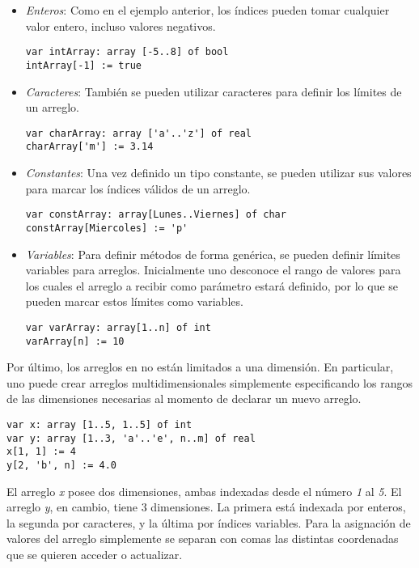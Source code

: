 \documentclass{article}
\begin{document}
\begin{itemize}

\item
\textit{Enteros}: Como en el ejemplo anterior, los índices pueden tomar cualquier valor entero, incluso valores negativos.
\begin{lstlisting}
var intArray: array [-5..8] of bool
intArray[-1] := true
\end{lstlisting}

\item
\textit{Caracteres}: También se pueden utilizar caracteres para definir los límites de un arreglo.
\begin{lstlisting}
var charArray: array ['a'..'z'] of real
charArray['m'] := 3.14
\end{lstlisting}

\item
\textit{Constantes}: Una vez definido un tipo constante, se pueden utilizar sus valores para marcar los índices válidos de un arreglo.
\begin{lstlisting}
var constArray: array[Lunes..Viernes] of char
constArray[Miercoles] := 'p'
\end{lstlisting}

\item
\textit{Variables}: Para definir métodos de forma genérica, se pueden definir límites variables para arreglos. Inicialmente uno desconoce el rango de valores para los cuales el arreglo a recibir como parámetro estará definido, por lo que se pueden marcar estos límites como variables.
\begin{lstlisting}
var varArray: array[1..n] of int
varArray[n] := 10
\end{lstlisting}

\end{itemize}

Por último, los arreglos en \Lang\space no están limitados a una dimensión.
En particular, uno puede crear arreglos multidimensionales simplemente especificando los rangos de las dimensiones necesarias al momento de declarar un nuevo arreglo.
\begin{lstlisting}
var x: array [1..5, 1..5] of int
var y: array [1..3, 'a'..'e', n..m] of real
x[1, 1] := 4
y[2, 'b', n] := 4.0
\end{lstlisting}

El arreglo \textit{x} posee dos dimensiones, ambas indexadas desde el número \textit{1} al \textit{5}.
El arreglo \textit{y}, en cambio, tiene 3 dimensiones.
La primera está indexada por enteros, la segunda por caracteres, y la última por índices variables.
Para la asignación de valores del arreglo simplemente se separan con comas las distintas coordenadas que se quieren acceder o actualizar.
\end{document}
